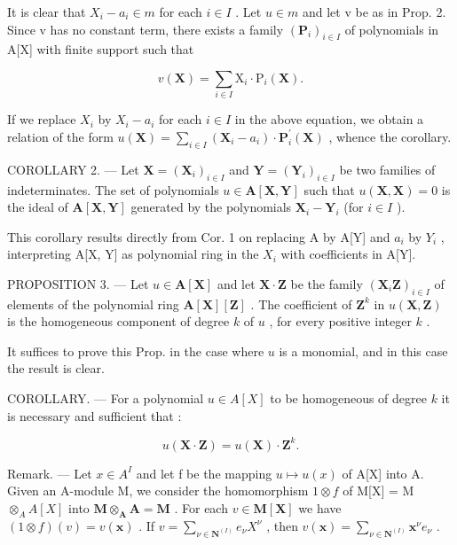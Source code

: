 It is clear that \(X_{i} - a_{i} \in m\) for each \(i \in I\) . Let \(u \in m\) and let v be as in Prop. 2. Since v has no constant term, there exists a family \((\mathbf{P}_{i})_{i \in I}\) of polynomials in A{[}X{]} with finite support such that

\[
v (\mathbf {X}) = \sum_ {i \in I} \mathrm{X} _ {i} \cdot \mathrm{P} _ {i} (\mathbf {X}).
\]

If we replace \(X_{i}\) by \(X_{i}-a_{i}\) for each \(i\in I\) in the above equation, we obtain a relation of the form \(u(\mathbf{X})=\sum_{i\in I}\left(\mathbf{X}_{i}-a_{i}\right)\cdot\mathbf{P}_{i}^{\prime}(\mathbf{X})\) , whence the corollary.

COROLLARY 2. --- Let \(\mathbf{X} = (\mathbf{X}_i)_{i \in I}\) and \(\mathbf{Y} = (\mathbf{Y}_i)_{i \in I}\) be two families of indeterminates. The set of polynomials \(u \in \mathbf{A}[\mathbf{X}, \mathbf{Y}]\) such that \(u(\mathbf{X}, \mathbf{X}) = 0\) is the ideal of \(\mathbf{A}[\mathbf{X}, \mathbf{Y}]\) generated by the polynomials \(\mathbf{X}_i - \mathbf{Y}_i\) (for \(i \in I\) ).

This corollary results directly from Cor. 1 on replacing A by A{[}Y{]} and \(a_{i}\) by \(Y_{i}\) , interpreting A{[}X, Y{]} as polynomial ring in the \(X_{i}\) with coefficients in A{[}Y{]}.

PROPOSITION 3. --- Let \(u \in \mathbf{A}[\mathbf{X}]\) and let \(\mathbf{X} \cdot \mathbf{Z}\) be the family \((\mathbf{X}_i\mathbf{Z})_{i \in I}\) of elements of the polynomial ring \(\mathbf{A}[\mathbf{X}][\mathbf{Z}]\) . The coefficient of \(\mathbf{Z}^k\) in \(u(\mathbf{X}, \mathbf{Z})\) is the homogeneous component of degree \(k\) of \(u\) , for every positive integer \(k\) .

It suffices to prove this Prop. in the case where \(u\) is a monomial, and in this case the result is clear.

COROLLARY. --- For a polynomial \(u \in A[X]\) to be homogeneous of degree \(k\) it is necessary and sufficient that :

\[
u (\mathbf {X} \cdot \mathbf {Z}) = u (\mathbf {X}) \cdot \mathbf {Z} ^ {k}.
\]

Remark. --- Let \(x \in A^{I}\) and let f be the mapping \(u \mapsto u(x)\) of A{[}X{]} into A. Given an A-module M, we consider the homomorphism \(1 \otimes f\) of M{[}X{]} = M \(\otimes_{A} A[X]\) into \(\mathbf{M} \otimes_{\mathbf{A}} \mathbf{A} = \mathbf{M}\) . For each \(v \in \mathbf{M}[\mathbf{X}]\) we have \((1 \otimes f)(v) = v(\mathbf{x})\) . If \(v = \sum_{\nu \in \mathbf{N}^{(I)}} e_{\nu} X^{\nu}\) , then \(v(\mathbf{x}) = \sum_{\nu \in \mathbf{N}^{(I)}} \mathbf{x}^{\nu} e_{\nu}\) .

